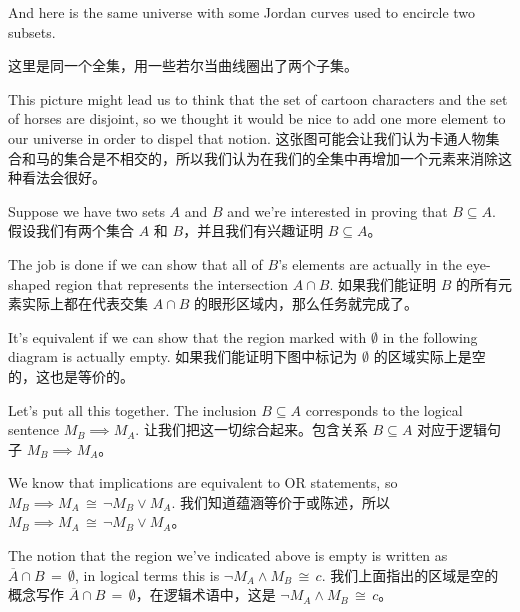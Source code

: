\vspace{.1in}

\noindent And here is the same universe with some Jordan curves 
used to encircle two subsets.

\noindent 这里是同一个全集，用一些若尔当曲线圈出了两个子集。
\vspace{.1in}



\vspace{.1in}

This picture might lead us to think that the set of cartoon characters
and the set of horses are disjoint, so we thought it would be nice
to add one more element to our universe in order to dispel that notion.
这张图可能会让我们认为卡通人物集合和马的集合是不相交的，所以我们认为在我们的全集中再增加一个元素来消除这种看法会很好。
\vspace{.1in}



\vspace{.1in}


Suppose we have two sets $A$ and $B$ and we're interested
in proving that $B \subseteq A$.
假设我们有两个集合 $A$ 和 $B$，并且我们有兴趣证明 $B \subseteq A$。

The job is done if we can show that
all of $B$'s elements are actually in the eye-shaped region that represents
the intersection $A \cap B$.
如果我们能证明 $B$ 的所有元素实际上都在代表交集 $A \cap B$ 的眼形区域内，那么任务就完成了。

It's equivalent if we can show that the
region marked with $\emptyset$ in the following diagram is actually empty.
如果我们能证明下图中标记为 $\emptyset$ 的区域实际上是空的，这也是等价的。
\vspace{.1in}



\vspace{.1in}

Let's put all this together.  The inclusion $B \subseteq A$ corresponds
to the logical sentence $M_B \implies M_A$.
让我们把这一切综合起来。包含关系 $B \subseteq A$ 对应于逻辑句子 $M_B \implies M_A$。

We know that implications
are equivalent to OR statements, so $M_B \implies M_A \, \cong \, 
{\lnot}M_B \lor M_A$.
我们知道蕴涵等价于或陈述，所以 $M_B \implies M_A \, \cong \, {\lnot}M_B \lor M_A$。

The notion that the region we've 
indicated above is empty is written as $\overline{A} \cap B \, = \, \emptyset$,
in logical terms this is ${\lnot}M_A \land M_B \, \cong \, c$.
我们上面指出的区域是空的概念写作 $\overline{A} \cap B \, = \, \emptyset$，在逻辑术语中，这是 ${\lnot}M_A \land M_B \, \cong \, c$。

